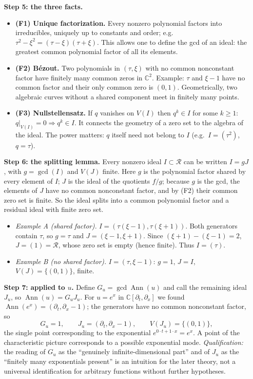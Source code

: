 \documentclass[11pt]{article}
\theoremstyle{plain}
\theoremstyle{definition}
\theoremstyle{remark}
\newcommand{\C}{\mathbb{C}}
\newcommand{\ring}{\mathcal{R}}            %
\DeclareMathOperator{\Ann}{Ann}             %
\newcommand{\Var}{V}                        %
\DeclareMathOperator{\Gcd}{gcd}
\begin{document}
\medskip\textbf{Step 5: the three facts.}
\begin{itemize}[nosep]
\item \textbf{(F1) Unique factorization.} Every nonzero polynomial factors into irreducibles, uniquely up to constants and order; e.g.\ $\tau^2-\xi^2=(\tau-\xi)(\tau+\xi)$. This allows one to define the gcd of an ideal: the greatest common polynomial factor of all its elements.
\item \textbf{(F2) B\'ezout.} Two polynomials in $(\tau,\xi)$ with no common nonconstant factor have finitely many common zeros in $\C^2$. Example: $\tau$ and $\xi-1$ have no common factor and their only common zero is $(0,1)$. Geometrically, two algebraic curves without a shared component meet in finitely many points.
\item \textbf{(F3) Nullstellensatz.} If $q$ vanishes on $\Var(I)$ then $q^k\in I$ for some $k\ge1$: $q|_{\Var(I)}=0\Rightarrow q^k\in I$. It connects the geometry of a zero set to the algebra of the ideal. The power matters: $q$ itself need not belong to $I$ (e.g.\ $I=(\tau^2)$, $q=\tau$).
\end{itemize}

\medskip\textbf{Step 6: the splitting lemma.} Every nonzero ideal $I\subset\ring$ can be written $I=gJ$, with $g=\Gcd(I)$ and $\Var(J)$ finite. Here $g$ is the polynomial factor shared by every element of $I$; $J$ is the ideal of the quotients $f/g$; because $g$ is the gcd, the elements of $J$ have no common nonconstant factor, and by (F2) their common zero set is finite. So the ideal splits into a common polynomial factor and a residual ideal with finite zero set.
\begin{itemize}[nosep]
\item \emph{Example A (shared factor).} $I=(\tau(\xi-1),\tau(\xi+1))$. Both generators contain $\tau$, so $g=\tau$ and $J=(\xi-1,\xi+1)$. Since $(\xi+1)-(\xi-1)=2$, $J=(1)=\ring$, whose zero set is empty (hence finite). Thus $I=(\tau)$.
\item \emph{Example B (no shared factor).} $I=(\tau,\xi-1)$: $g=1$, $J=I$, $\Var(J)=\{(0,1)\}$, finite.
\end{itemize}

\medskip\textbf{Step 7: applied to $u$.} Define $G_u=\Gcd\Ann(u)$ and call the remaining ideal $J_u$, so $\Ann(u)=G_uJ_u$. For $u=e^x$ in $\C[\partial_t,\partial_x]$ we found $\Ann(e^x)=(\partial_t,\partial_x-1)$; the generators have no common nonconstant factor, so
\[
G_u=1,\qquad J_u=(\partial_t,\partial_x-1),\qquad \Var(J_u)=\{(0,1)\},
\]
the single point corresponding to the exponential $e^{0\cdot t+1\cdot x}=e^x$. A point of the characteristic picture corresponds to a possible exponential mode. \emph{Qualification:} the reading of $G_u$ as the ``genuinely infinite-dimensional part'' and of $J_u$ as the ``finitely many exponentials present'' is an intuition for the later theory, not a universal identification for arbitrary functions without further hypotheses.
\end{document}
